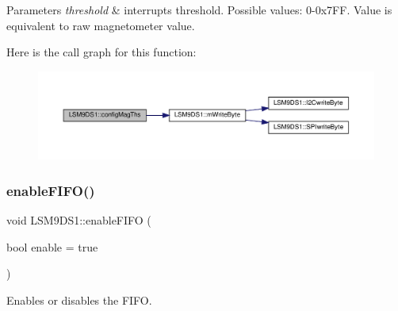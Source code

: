 \begin{DoxyParams}{Parameters}
{\em threshold} & interrupts threshold. Possible values\+: 0-\/0x7\+FF. Value is equivalent to raw magnetometer value. \\
\hline
\end{DoxyParams}
Here is the call graph for this function\+:\nopagebreak
\begin{figure}[H]
\begin{center}
\leavevmode
\includegraphics[width=350pt]{classLSM9DS1_a87cf3dd3a4d9ca79106eb7c1c866a224_cgraph}
\end{center}
\end{figure}
\mbox{\label{classLSM9DS1_a5f01141131318697838f15d7e5d10f2c}} 
\subsubsection{\texorpdfstring{enable\+F\+I\+F\+O()}{enableFIFO()}}
{\footnotesize\ttfamily void L\+S\+M9\+D\+S1\+::enable\+F\+I\+FO (\begin{DoxyParamCaption}\item[{bool}]{enable = {\ttfamily true} }\end{DoxyParamCaption})}



Enables or disables the F\+I\+FO. 


